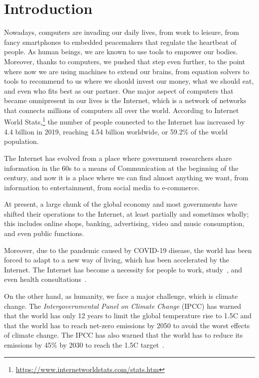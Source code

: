 \chapter{Introduction}
\label{chapter:introduction}

Nowadays, computers are invading our daily lives, from work to leisure, from fancy smartphones to embedded peacemakers that regulate the heartbeat of people.
As human beings, we are known to use tools to empower our bodies.
Moreover, thanks to computers, we pushed that step even further, to the point where now we are using machines to extend our brains, from equation solvers to tools to recommend to us where we should invest our money, what we should eat, and even who fits best as our partner.
One major aspect of computers that became omnipresent in our lives is the Internet, which is a network of networks that connects millions of computers all over the world.
According to Internet World Stats,\footnote{\url{https://www.internetworldstats.com/stats.htm}} the number of people connected to the Internet has increased by 4.4 billion in 2019, reaching 4.54 billion worldwide, or 59.2\% of the world population.

The Internet has evolved from a place where government researchers share information in the 60s to a means of Communication at the beginning of the century, and now it is a place where we can find almost anything we want, from information to entertainment, from social media to e-commerce.

At present, a large chunk of the global economy and most governments have shifted their operations to the Internet, at least partially and sometimes wholly; this includes online shops, banking, advertising, video and music consumption, and even public functions.

Moreover, due to the pandemic caused by COVID-19 disease, the world has been forced to adapt to a new way of living, which has been accelerated by the Internet.
The Internet has become a necessity for people to work, study~\cite{naresh2020education}, and even health consultations~\cite{liaw2021primary}.

On the other hand, as humanity, we face a major challenge, which is climate change.
The \emph{Intergovernmental Panel on Climate Change} (IPCC) has warned that the world has only 12 years to limit the global temperature rise to 1.5\degree C and that the world has to reach net-zero emissions by 2050 to avoid the worst effects of climate change.
The IPCC has also warned that the world has to reduce its emissions by 45\% by 2030 to reach the 1.5\degree C target~\cite{portner2022climate}.

